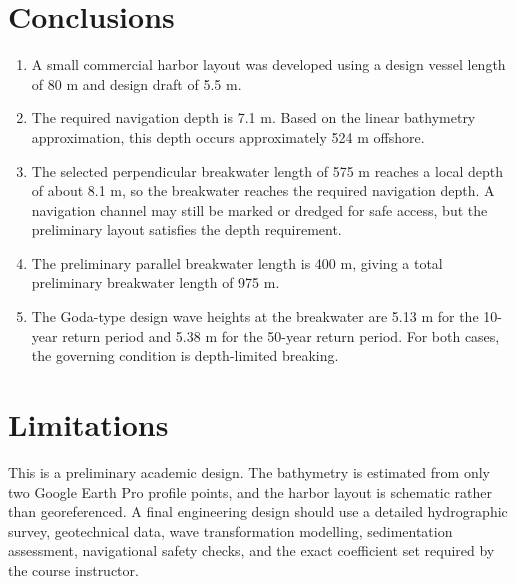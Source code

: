 \documentclass[11pt,a4paper]{article}
\begin{document}
\section{Conclusions}
\begin{enumerate}[leftmargin=1.0cm]
    \item A small commercial harbor layout was developed using a design vessel length of 80 m and design draft of 5.5 m.
    \item The required navigation depth is 7.1 m. Based on the linear bathymetry approximation, this depth occurs approximately 524 m offshore.
    \item The selected perpendicular breakwater length of 575 m reaches a local depth of about 8.1 m, so the breakwater reaches the required navigation depth. A navigation channel may still be marked or dredged for safe access, but the preliminary layout satisfies the depth requirement.
    \item The preliminary parallel breakwater length is 400 m, giving a total preliminary breakwater length of 975 m.
    \item The Goda-type design wave heights at the breakwater are 5.13 m for the 10-year return period and 5.38 m for the 50-year return period. For both cases, the governing condition is depth-limited breaking.
\end{enumerate}

\section{Limitations}
This is a preliminary academic design. The bathymetry is estimated from only two Google Earth Pro profile points, and the harbor layout is schematic rather than georeferenced. A final engineering design should use a detailed hydrographic survey, geotechnical data, wave transformation modelling, sedimentation assessment, navigational safety checks, and the exact coefficient set required by the course instructor.
\end{document}

